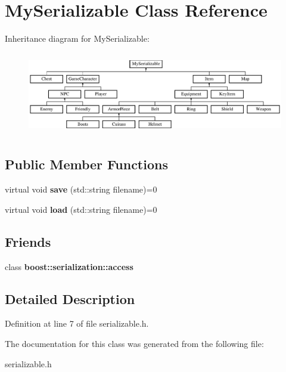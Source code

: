 \hypertarget{class_my_serializable}{}\section{My\+Serializable Class Reference}
\label{class_my_serializable}
Inheritance diagram for My\+Serializable\+:\begin{figure}[H]
\begin{center}
\leavevmode
\includegraphics[height=3.669725cm]{class_my_serializable}
\end{center}
\end{figure}
\subsection*{Public Member Functions}
\begin{DoxyCompactItemize}
\item 
\hypertarget{class_my_serializable_aecba7b7a0a257f15ccd42bcd7c320069}{}\label{class_my_serializable_aecba7b7a0a257f15ccd42bcd7c320069} 
virtual void {\bfseries save} (std\+::string filename)=0
\item 
\hypertarget{class_my_serializable_afa91367dc4d5606c1d62f5c50636e171}{}\label{class_my_serializable_afa91367dc4d5606c1d62f5c50636e171} 
virtual void {\bfseries load} (std\+::string filename)=0
\end{DoxyCompactItemize}
\subsection*{Friends}
\begin{DoxyCompactItemize}
\item 
\hypertarget{class_my_serializable_ac98d07dd8f7b70e16ccb9a01abf56b9c}{}\label{class_my_serializable_ac98d07dd8f7b70e16ccb9a01abf56b9c} 
class {\bfseries boost\+::serialization\+::access}
\end{DoxyCompactItemize}


\subsection{Detailed Description}


Definition at line 7 of file serializable.\+h.



The documentation for this class was generated from the following file\+:\begin{DoxyCompactItemize}
\item 
serializable.\+h\end{DoxyCompactItemize}
